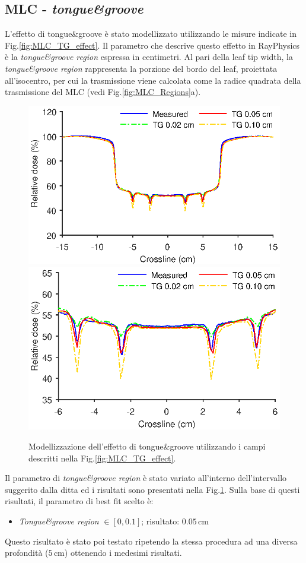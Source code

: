\subsection{MLC - \textit{tongue\&{}groove}}
L'effetto di tongue\&{}groove è stato modellizzato utilizzando le misure indicate in Fig.\ref{fig:MLC_TG_effect}. Il parametro che descrive questo effetto in RayPhysics è la \textit{tongue\&{}groove region} espressa in centimetri. Al pari della leaf tip width, la \textit{tongue\&{}groove region} rappresenta la porzione del bordo del leaf, proiettata all'isocentro, per cui la trasmissione viene calcolata come la radice quadrata della trasmissione del MLC (vedi Fig.\ref{fig:MLC_Regions}a). 
\begin{figure}
\centering
\includegraphics[width=.7\textwidth]{./cap2/MLC_Plots/TG/TG_modeling.eps}
\includegraphics[width=.7\textwidth]{./cap2/MLC_Plots/TG/TG_modelingZOOM.eps}
\caption{Modellizzazione dell'effetto di tongue\&{}groove utilizzando i campi descritti nella Fig.\ref{fig:MLC_TG_effect}.}
\label{fig:MLC_TG_modeling}
\end{figure}

Il parametro di \textit{tongue\&{}groove region} è stato variato all'interno dell'intervallo suggerito dalla ditta ed i risultati sono presentati nella Fig.\ref{fig:MLC_TG_modeling}. Sulla base di questi risultati, il parametro di best fit scelto è:
\begin{itemize}
\item \textit{Tongue\&{}groove region} $\in [0, 0.1]$; risultato: $0.05\,$cm
\end{itemize}
Questo risultato è stato poi testato ripetendo la stessa procedura ad una diversa profondità ($5\,$cm) ottenendo i medesimi risultati.\\


